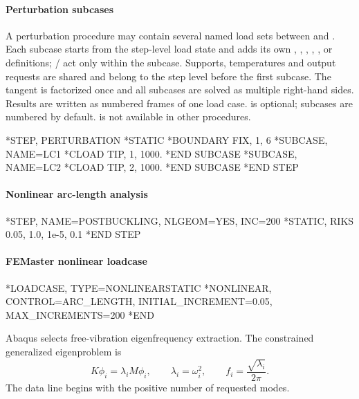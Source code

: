 \paragraph*{Perturbation subcases}

A  perturbation procedure may contain several named load sets
between  and . Each subcase starts from the
step-level load state and adds its own , ,
, , ,  or 
definitions; / act only within the subcase. Supports,
temperatures and output requests are shared and belong to the step level
before the first subcase. The tangent is factorized once and all subcases are
solved as multiple right-hand sides. Results are written as numbered frames
of one load case.  is optional; subcases are numbered by default.
 is not available in other procedures.

\begin{inputdeck}
*STEP, PERTURBATION
*STATIC
*BOUNDARY
FIX, 1, 6
*SUBCASE, NAME=LC1
*CLOAD
TIP, 1, 1000.
*END SUBCASE
*SUBCASE, NAME=LC2
*CLOAD
TIP, 2, 1000.
*END SUBCASE
*END STEP
\end{inputdeck}

\paragraph*{Nonlinear arc-length analysis}
\begin{inputdeck}
*STEP, NAME=POSTBUCKLING, NLGEOM=YES, INC=200
*STATIC, RIKS
0.05, 1.0, 1e-5, 0.1
*END STEP
\end{inputdeck}

\paragraph*{FEMaster nonlinear loadcase}
\begin{inputdeck}
*LOADCASE, TYPE=NONLINEARSTATIC
*NONLINEAR, CONTROL=ARC_LENGTH, INITIAL_INCREMENT=0.05, MAX_INCREMENTS=200
*END
\end{inputdeck}


Abaqus  selects free-vibration eigenfrequency extraction. The constrained generalized eigenproblem is
\[
K\phi_i=\lambda_i M\phi_i,
\qquad
\lambda_i=\omega_i^2,
\qquad
f_i=\frac{\sqrt{\lambda_i}}{2\pi}.
\]
The data line begins with the positive number of requested modes.

